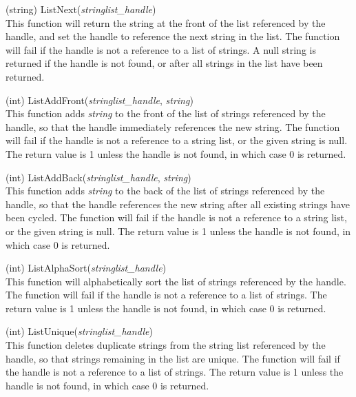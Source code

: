 \begin{description}
\item{(string) \vt ListNext({\it stringlist\_handle\/})}\\
This function will return the string at the front of the list
referenced by the handle, and set the handle to reference the next
string in the list.  The function will fail if the handle is not a
reference to a list of strings.  A null string is returned if the
handle is not found, or after all strings in the list have been
returned.

\item{(int) \vt ListAddFront({\it stringlist\_handle\/}, {\it string\/})}\\
This function adds {\it string} to the front of the list of strings
referenced by the handle, so that the handle immediately references
the new string.  The function will fail if the handle is not a
reference to a string list, or the given string is null.  The return
value is 1 unless the handle is not found, in which case 0 is
returned.

\item{(int) \vt ListAddBack({\it stringlist\_handle\/}, {\it string\/})}\\
This function adds {\it string} to the back of the list of strings
referenced by the handle, so that the handle references the new string
after all existing strings have been cycled.  The function will fail
if the handle is not a reference to a string list, or the given string
is null.  The return value is 1 unless the handle is not found, in
which case 0 is returned.

\item{(int) \vt ListAlphaSort({\it stringlist\_handle\/})}\\
This function will alphabetically sort the list of strings referenced
by the handle.  The function will fail if the handle is not a
reference to a list of strings.  The return value is 1 unless the
handle is not found, in which case 0 is returned.

\item{(int) \vt ListUnique({\it stringlist\_handle\/})}\\
This function deletes duplicate strings from the string list
referenced by the handle, so that strings remaining in the list are
unique.  The function will fail if the handle is not a reference to a
list of strings.  The return value is 1 unless the handle is not
found, in which case 0 is returned.


\end{description}
